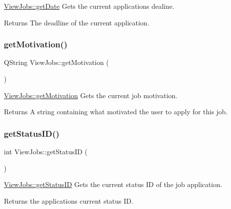\hyperlink{class_view_jobs_af046f9201cc6031e070b4f9b613a35f9}{View\+Jobs\+::get\+Date} Gets the current application\textquotesingle{}s dealine. 

\begin{DoxyReturn}{Returns}
The deadline of the current application. 
\end{DoxyReturn}
\mbox{\label{class_view_jobs_a238ec5365ef2c39baa97670769dfedca}} 
\subsubsection{\texorpdfstring{get\+Motivation()}{getMotivation()}}
{\footnotesize\ttfamily Q\+String View\+Jobs\+::get\+Motivation (\begin{DoxyParamCaption}{ }\end{DoxyParamCaption})}



\hyperlink{class_view_jobs_a238ec5365ef2c39baa97670769dfedca}{View\+Jobs\+::get\+Motivation} Gets the current job motivation. 

\begin{DoxyReturn}{Returns}
A string containing what motivated the user to apply for this job. 
\end{DoxyReturn}
\mbox{\label{class_view_jobs_a91696fde9f0a663bae929390aac8324b}} 
\subsubsection{\texorpdfstring{get\+Status\+I\+D()}{getStatusID()}}
{\footnotesize\ttfamily int View\+Jobs\+::get\+Status\+ID (\begin{DoxyParamCaption}{ }\end{DoxyParamCaption})}



\hyperlink{class_view_jobs_a91696fde9f0a663bae929390aac8324b}{View\+Jobs\+::get\+Status\+ID} Gets the current status ID of the job application. 

\begin{DoxyReturn}{Returns}
the application\textquotesingle{}s current status ID. 
\end{DoxyReturn}
\mbox{\label{class_view_jobs_ae78f119d37c77a9e3e457ecfd78d7de3}} 
